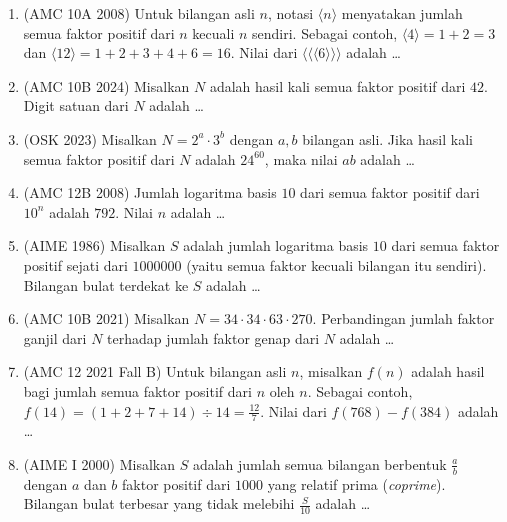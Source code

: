 \documentclass[12pt]{scrartcl}
\begin{document}
\begin{enumerate}[resume]

	\item (AMC 10A 2008)
	Untuk bilangan asli $n$, notasi $\langle n \rangle$ menyatakan jumlah
	semua faktor positif dari $n$ kecuali $n$ sendiri.
	Sebagai contoh, $\langle 4 \rangle = 1 + 2 = 3$ dan
	$\langle 12 \rangle = 1 + 2 + 3 + 4 + 6 = 16$.
	Nilai dari $\langle \langle \langle 6 \rangle \rangle \rangle$ adalah \dots

	\item (AMC 10B 2024)
	Misalkan $N$ adalah hasil kali semua faktor positif dari $42$.
	Digit satuan dari $N$ adalah \dots

	\item (OSK 2023)
	Misalkan $N = 2^{a} \cdot 3^{b}$ dengan $a, b$ bilangan asli.
	Jika hasil kali semua faktor positif dari $N$ adalah $24^{60}$,
	maka nilai $ab$ adalah \dots

	\item (AMC 12B 2008)
	Jumlah logaritma basis $10$ dari semua faktor positif dari $10^{n}$
	adalah $792$. Nilai $n$ adalah \dots

	\item (AIME 1986)
	Misalkan $S$ adalah jumlah logaritma basis $10$ dari semua faktor
	positif sejati dari $1000000$ (yaitu semua faktor kecuali bilangan itu
	sendiri). Bilangan bulat terdekat ke $S$ adalah \dots

	\item (AMC 10B 2021)
	Misalkan $N = 34 \cdot 34 \cdot 63 \cdot 270$.
	Perbandingan jumlah faktor ganjil dari $N$ terhadap jumlah faktor genap
	dari $N$ adalah \dots

	\item (AMC 12 2021 Fall B)
	Untuk bilangan asli $n$, misalkan $f(n)$ adalah hasil bagi jumlah semua
	faktor positif dari $n$ oleh $n$.
	Sebagai contoh, $f(14) = (1 + 2 + 7 + 14) \div 14 = \frac{12}{7}$.
	Nilai dari $f(768) - f(384)$ adalah \dots

	\item (AIME I 2000)
	Misalkan $S$ adalah jumlah semua bilangan berbentuk $\frac{a}{b}$ dengan
	$a$ dan $b$ faktor positif dari $1000$ yang relatif prima (\textit{coprime}).
	Bilangan bulat terbesar yang tidak melebihi $\frac{S}{10}$ adalah \dots


\end{enumerate}
\end{document}
